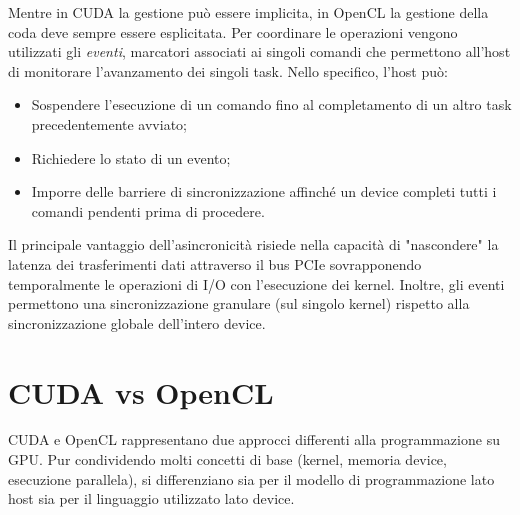 Mentre in CUDA la gestione può essere implicita, in OpenCL la gestione della coda deve sempre essere esplicitata. Per coordinare le operazioni vengono utilizzati gli \emph{eventi}, marcatori associati ai singoli comandi che permettono all'host di monitorare l'avanzamento dei singoli task. Nello specifico, l'host può:

\begin{itemize}
    \item Sospendere l'esecuzione di un comando fino al completamento di un altro task precedentemente avviato;
    \item Richiedere lo stato di un evento;
    \item Imporre delle barriere di sincronizzazione affinché un device completi tutti i comandi pendenti prima di procedere.
\end{itemize}

Il principale vantaggio dell’asincronicità risiede nella capacità di "nascondere" la latenza dei trasferimenti dati attraverso il bus PCIe sovrapponendo temporalmente le operazioni di I/O con l'esecuzione dei kernel.
Inoltre, gli eventi permettono una sincronizzazione granulare (sul singolo kernel) rispetto alla sincronizzazione globale dell'intero device.

\section{CUDA vs OpenCL}

CUDA e OpenCL rappresentano due approcci differenti alla programmazione su GPU. Pur condividendo molti concetti di base (kernel, memoria device, esecuzione parallela), si differenziano sia per il modello di programmazione lato host sia per il linguaggio utilizzato lato device.

